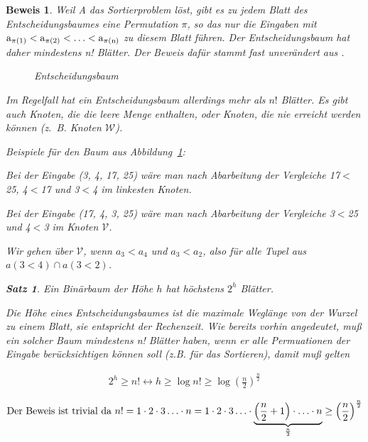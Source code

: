 \documentclass[ngerman,draft,parskip=half*,twoside]{scrreprt}
\theoremstyle{break}
\newtheorem{beweis}{Beweis}
\newtheorem{satz}{Satz}
\begin{document}
\begin{beweis}
Weil A das Sortierproblem löst, gibt es zu jedem Blatt des Entscheidungsbaumes eine Permutation $\pi$, so das nur die Eingaben mit 
\(\textup{a}_{\pi(1)}<\textup{a}_{\pi(2)}<\ldots<\textup{a}_{\pi(\textup{n})}\) zu diesem Blatt führen. Der Entscheidungsbaum hat 
daher mindestens n! Blätter. Der Beweis dafür stammt fast unverändert aus \cite{klein}.
 
%
  \begin{figure}
    \centering
  \caption{Entscheidungsbaum}
  \label{271003c}
  \end{figure}

Im Regelfall hat ein Entscheidungsbaum allerdings mehr 
als $n!$ Blätter. Es gibt auch Knoten, die die leere Menge enthalten, oder Knoten, die nie erreicht werden können
(z.~B. Knoten $\mathcal{W}$).
\bigskip

\noindent	
Beispiele für den Baum aus Abbildung~\ref{271003c}:

\noindent
Bei der Eingabe (3, 4, 17, 25) wäre man nach Abarbeitung der Vergleiche 17$<$25, 4$<$17 und 3$<$4 im linkesten Knoten.

\noindent
Bei der Eingabe (17, 4, 3, 25) wäre man nach Abarbeitung der Vergleiche 3$<$25 und 4$<$3 im Knoten $\mathcal{V}$.

\noindent
Wir gehen über $\mathcal{V}$, wenn $a_3 < a_4$ und $a_3 < a_2 $, also für alle Tupel aus \( a(3<4) \cap a(3<2) \).

  \begin{satz}
  Ein Binärbaum der Höhe $h$ hat höchstens \( 2^h \) Blätter.
  \end{satz} 
 
Die Höhe eines Entscheidungsbaumes ist die maximale Weglänge von der Wurzel zu einem Blatt, sie entspricht der Rechenzeit. Wie bereits vorhin angedeutet, muß ein
solcher Baum mindestens n! Blätter haben, wenn er alle Permuationen der Eingabe berücksichtigen können soll (z.B. für das
Sortieren), damit muß gelten

  \begin{gather*}
   2^h \geq n! \leftrightarrow h \geq \log n! \geq \log \left(\frac{n}{2}\right)^{\frac{n}{2}}  
  \end{gather*}

  \begin{gather*}
  \textup{Der Beweis ist trivial da}\
  n! = 1 \cdot 2 \cdot 3 \ldots \cdot n = 1 \cdot 2 \cdot 3 \ldots \cdot \underbrace{\left(\frac{n}{2}+1\right) \cdot \ldots 
  \cdot n}_{\frac{n}{2}} \geq \left(\frac{n}{2}\right)^{\frac{n}{2}} 
  \end{gather*}


\end{beweis}
\end{document}
